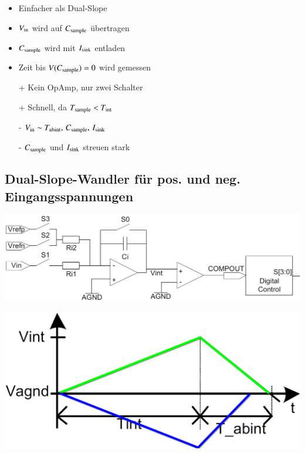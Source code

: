 \begin{minipage}[t]{0.48\columnwidth}
    \begin{itemize}
        \item Einfacher als Dual-Slope
        \item $V_ {\rm in}$ wird auf $C_{\rm sample}$ übertragen
        \item $C_{\rm sample}$ wird mit $I_{\rm sink}$ entladen
        \item Zeit bis $V(C_{\rm sample}) = 0$ wird gemessen
    \end{itemize}
\end{minipage}
\hfill
\begin{minipage}[t]{0.48\columnwidth}
    \begin{itemize}
        \item[+] Kein OpAmp, nur zwei Schalter
        \item[+] Schnell, da $T_{\rm sample} < T_{\rm int}$
        \item[-] $V_{\rm in} \sim T_{\rm abint}, \, C_{\rm sample}, \, I_{\rm sink}$
        \item[-] $C_{\rm sample}$ und $I_{\rm sink}$ streuen stark
    \end{itemize}
\end{minipage}


\subsection{Dual-Slope-Wandler für pos. und neg. Eingangsspannungen}

\begin{minipage}[c]{0.52\columnwidth}
    \includegraphics[width=\columnwidth]{images/dual_slope_ADC_pos_neg.png}
\end{minipage}
\hfill
\begin{minipage}[c]{0.37\columnwidth}
    \includegraphics[width=\columnwidth]{images/dual_slope_ADC_pos_neg_timing.png}
\end{minipage}

